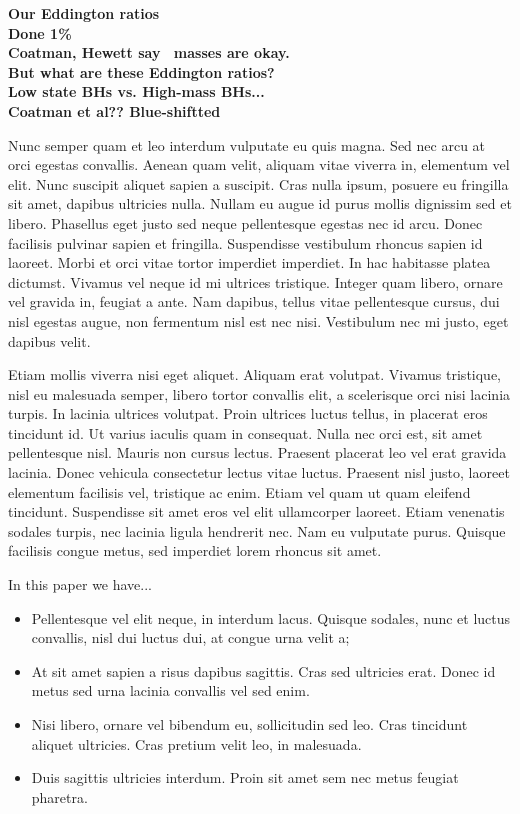 \documentclass[a4paper,fleqn,usenatbib]{mnras}
\begin{document}
\noindent
{\bf Our Eddington ratios \\
Done 1\% \\
Coatman, Hewett say \civ\ masses are okay.\\
But what are these Eddington ratios? \\
Low state BHs vs. High-mass BHs... \\
Coatman et al?? Blue-shiftted \\
}

Nunc semper quam et leo interdum vulputate eu quis magna. Sed nec arcu
at orci egestas convallis. Aenean quam velit, aliquam vitae viverra
in, elementum vel elit. Nunc suscipit aliquet sapien a suscipit. Cras
nulla ipsum, posuere eu fringilla sit amet, dapibus ultricies
nulla. Nullam eu augue id purus mollis dignissim sed et
libero. Phasellus eget justo sed neque pellentesque egestas nec id
arcu. Donec facilisis pulvinar sapien et fringilla. Suspendisse
vestibulum rhoncus sapien id laoreet. Morbi et orci vitae tortor
imperdiet imperdiet. In hac habitasse platea dictumst. Vivamus vel
neque id mi ultrices tristique. Integer quam libero, ornare vel
gravida in, feugiat a ante. Nam dapibus, tellus vitae pellentesque
cursus, dui nisl egestas augue, non fermentum nisl est nec
nisi. Vestibulum nec mi justo, eget dapibus velit.

Etiam mollis viverra nisi eget aliquet. Aliquam erat volutpat. Vivamus
tristique, nisl eu malesuada semper, libero tortor convallis elit, a
scelerisque orci nisi lacinia turpis. In lacinia ultrices
volutpat. Proin ultrices luctus tellus, in placerat eros tincidunt
id. Ut varius iaculis quam in consequat. Nulla nec orci est, sit amet
pellentesque nisl. Mauris non cursus lectus. Praesent placerat leo vel
erat gravida lacinia. Donec vehicula consectetur lectus vitae
luctus. Praesent nisl justo, laoreet elementum facilisis vel,
tristique ac enim. Etiam vel quam ut quam eleifend
tincidunt. Suspendisse sit amet eros vel elit ullamcorper
laoreet. Etiam venenatis sodales turpis, nec lacinia ligula hendrerit
nec. Nam eu vulputate purus. Quisque facilisis congue metus, sed
imperdiet lorem rhoncus sit amet.

In this paper we have... 
\begin{itemize}
\item Pellentesque vel elit neque, in interdum lacus. Quisque sodales, nunc et luctus convallis, nisl dui luctus dui, at congue urna velit a; 
\item At sit amet sapien a risus dapibus sagittis. Cras sed ultricies erat. Donec id metus sed urna lacinia convallis vel sed enim. 
\item Nisi libero, ornare vel bibendum eu, sollicitudin sed leo. Cras tincidunt aliquet ultricies. Cras pretium velit leo, in malesuada. 
\item Duis sagittis ultricies interdum. Proin sit amet sem nec metus feugiat pharetra.
\end{itemize}
\end{document}
